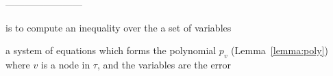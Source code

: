\documentclass{article}
\begin{document}

------------------------





is to compute an inequality over the a set of variables


a system of equations  which forms the polynomial $p_v$ (Lemma~\ref{lemma:poly}) where $v$ is a node in $\tau$, and the variables are the error 
\end{document}
